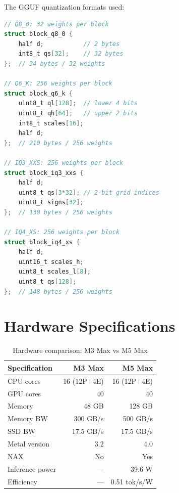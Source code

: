 \documentclass[11pt,twocolumn]{article}
\begin{document}
The GGUF quantization formats used:

\begin{lstlisting}[language=C,caption=GGUF block structures]
// Q8_0: 32 weights per block
struct block_q8_0 {
    half d;           // 2 bytes
    int8_t qs[32];    // 32 bytes
};  // 34 bytes / 32 weights

// Q6_K: 256 weights per block
struct block_q6_k {
    uint8_t ql[128];  // lower 4 bits
    uint8_t qh[64];   // upper 2 bits
    int8_t scales[16];
    half d;
};  // 210 bytes / 256 weights

// IQ3_XXS: 256 weights per block
struct block_iq3_xxs {
    half d;
    uint8_t qs[3*32]; // 2-bit grid indices
    uint8_t signs[32];
};  // 130 bytes / 256 weights

// IQ4_XS: 256 weights per block
struct block_iq4_xs {
    half d;
    uint16_t scales_h;
    uint8_t scales_l[8];
    uint8_t qs[128];
};  // 148 bytes / 256 weights
\end{lstlisting}

\clearpage
\section{Hardware Specifications}

\begin{table}[h]
\centering
\caption{Hardware comparison: M3 Max vs M5 Max}
\label{tab:hardware}
\begin{tabular}{lrr}
\toprule
\textbf{Specification} & \textbf{M3 Max} & \textbf{M5 Max} \\
\midrule
CPU cores & 16 (12P+4E) & 16 (12P+4E) \\
GPU cores & 40 & 40 \\
Memory & 48 GB & 128 GB \\
Memory BW & 300 GB/s & 500 GB/s \\
SSD BW & 17.5 GB/s & 17.5 GB/s \\
Metal version & 3.2 & 4.0 \\
NAX & No & Yes \\
Inference power & --- & 39.6 W \\
Efficiency & --- & 0.51 tok/s/W \\
\bottomrule
\end{tabular}
\end{table}
\end{document}
